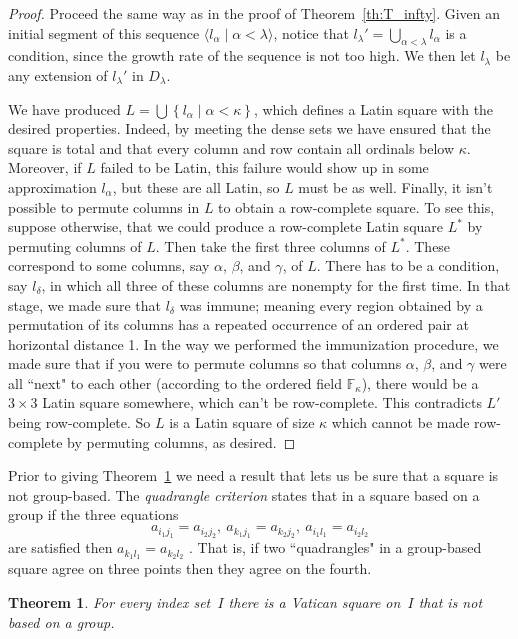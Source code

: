 \documentclass[12pt,a4paper]{article}
\newtheorem{thm}{Theorem}[section]
\newcommand{\F}{\mathbb{F}}
\newcommand{\st}{\; | \;}
\newcommand{\set}[2]{\left\{#1\st #2 \right\}}
\newcommand{\seq}[2]{\langle #1 \st #2 \rangle}
\begin{document}
\begin{proof}
Proceed the same way as in the proof of Theorem~\ref{th:T_infty}. Given an initial segment of this sequence $\seq{l_\alpha}{\alpha<\lambda}$, notice that $l_\lambda'=\bigcup_{\alpha<\lambda}l_\alpha$ is a condition, since the growth rate of the sequence is not too high. We then let $l_\lambda$ be any extension of $l_\lambda'$ in $D_\lambda$.

We have produced $L=\bigcup \set{l_\alpha}{\alpha<\kappa}$, which defines a Latin square with the desired properties. Indeed, by meeting the dense sets we have ensured that the square is total and that every column and row contain all ordinals below $\kappa$. Moreover, if $L$ failed to be Latin, this failure would show up in some approximation $l_\alpha$, but these are all Latin, so $L$ must be as well. Finally, it isn't possible to permute columns in $L$ to obtain a row-complete square. To see this, suppose otherwise, that we could produce a row-complete Latin square $L^*$ by permuting columns of $L$. Then take the first three columns of $L^*$. These correspond to some columns, say $\alpha$, $\beta$, and $\gamma$, of $L$. There has to be a condition, say $l_\delta$, in which all three of these columns are nonempty for the first time. In that stage, we made sure that $l_\delta$ was immune; meaning every region obtained by a permutation of its columns has a repeated occurrence of an ordered pair at horizontal distance 1. In the way we performed the immunization procedure, we made sure that if you were to permute columns so that columns $\alpha$, $\beta$, and $\gamma$ were all ``next" to each other (according to the ordered field $\F_\kappa$), there would be a $3\times3$ Latin square somewhere, which can't be row-complete. This contradicts $L'$ being row-complete. So $L$ is a Latin square of size $\kappa$ which cannot be made row-complete by permuting columns, as desired.
\end{proof}



Prior to giving Theorem~\ref{th:infvat} we need a result that lets us be sure that a square is not group-based.  The {\em quadrangle criterion} states that in a square based on a group if the three equations
$$a_{i_1j_1} = a_{i_2j_2}, \ a_{k_1j_1} = a_{k_2j_2}, \ a_{i_1l_1} = a_{i_2l_2}$$
are satisfied then $a_{k_1l_1} = a_{k_2l_2}$ \cite[Theorem~1.2.1]{DK15}.  That is, if two ``quadrangles" in a group-based square agree on three points then they agree on the fourth.


\begin{thm}\label{th:infvat}
For every index set~$I$  
there is a Vatican square on~$I$ that is not based on a  group.
\end{thm}
\end{document}
